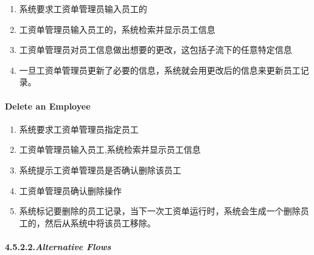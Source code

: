 \documentclass{article}
\begin{document}
\begin{enumerate}
\begin{enumerate}[noitemsep,topsep=\mdcompacttopsep]
\item{}系统要求工资单管理员输入员工的%

\item{}工资单管理员输入员工的，系统检索并显示员工信息%

\item{}工资单管理员对员工信息做出想要的更改，这包括子流下的任意特定信息%

\item{}一旦工资单管理员更新了必要的信息，系统就会用更改后的信息来更新员工记录。%
\end{enumerate}%

\paragraph{Delete an Employee}\label{sec-delete-an-employee}%

\begin{enumerate}[noitemsep,topsep=\mdcompacttopsep]%

\item{}系统要求工资单管理员指定员工%

\item{}工资单管理员输入员工,系统检索并显示员工信息%

\item{}系统提示工资单管理员是否确认删除该员工%

\item{}工资单管理员确认删除操作%

\item{}系统标记要删除的员工记录，当下一次工资单运行时，系统会生成一个删除员工的，然后从系统中将该员工移除。%
\end{enumerate}%
\end{enumerate}%

\paragraph{4.5.2.2.\hspace*{0.5em}\emph{Alternative Flows}}\label{sec-_alternative-flows_}%
\end{document}
